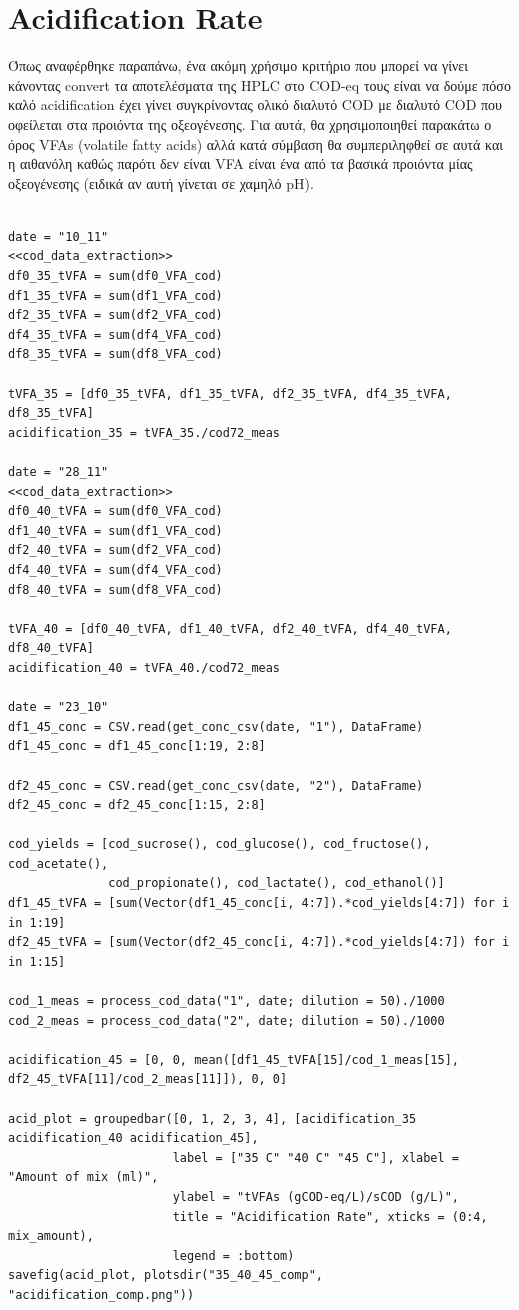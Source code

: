 \documentclass[11pt]{article}
\begin{document}
\section{Acidification Rate}
\label{sec:orgcb787cc}
Όπως αναφέρθηκε παραπάνω, ένα ακόμη χρήσιμο κριτήριο που μπορεί να γίνει κάνοντας convert τα αποτελέσματα της HPLC στο COD-eq τους είναι να δούμε πόσο καλό acidification έχει γίνει συγκρίνοντας ολικό διαλυτό COD με διαλυτό COD που οφείλεται στα προιόντα της οξεογένεσης. Για αυτά, θα χρησιμοποιηθεί παρακάτω ο όρος VFAs (volatile fatty acids) αλλά κατά σύμβαση θα συμπεριληφθεί σε αυτά και η αιθανόλη καθώς παρότι δεν είναι VFA είναι ένα από τα βασικά προιόντα μίας οξεογένεσης (ειδικά αν αυτή γίνεται σε χαμηλό pH).

\begin{verbatim}

date = "10_11"
<<cod_data_extraction>>
df0_35_tVFA = sum(df0_VFA_cod)
df1_35_tVFA = sum(df1_VFA_cod)
df2_35_tVFA = sum(df2_VFA_cod)
df4_35_tVFA = sum(df4_VFA_cod)
df8_35_tVFA = sum(df8_VFA_cod)

tVFA_35 = [df0_35_tVFA, df1_35_tVFA, df2_35_tVFA, df4_35_tVFA, df8_35_tVFA]
acidification_35 = tVFA_35./cod72_meas

date = "28_11"
<<cod_data_extraction>>
df0_40_tVFA = sum(df0_VFA_cod)
df1_40_tVFA = sum(df1_VFA_cod)
df2_40_tVFA = sum(df2_VFA_cod)
df4_40_tVFA = sum(df4_VFA_cod)
df8_40_tVFA = sum(df8_VFA_cod)

tVFA_40 = [df0_40_tVFA, df1_40_tVFA, df2_40_tVFA, df4_40_tVFA, df8_40_tVFA]
acidification_40 = tVFA_40./cod72_meas

date = "23_10"
df1_45_conc = CSV.read(get_conc_csv(date, "1"), DataFrame)
df1_45_conc = df1_45_conc[1:19, 2:8]

df2_45_conc = CSV.read(get_conc_csv(date, "2"), DataFrame)
df2_45_conc = df2_45_conc[1:15, 2:8]

cod_yields = [cod_sucrose(), cod_glucose(), cod_fructose(), cod_acetate(),
              cod_propionate(), cod_lactate(), cod_ethanol()]
df1_45_tVFA = [sum(Vector(df1_45_conc[i, 4:7]).*cod_yields[4:7]) for i in 1:19]
df2_45_tVFA = [sum(Vector(df2_45_conc[i, 4:7]).*cod_yields[4:7]) for i in 1:15]

cod_1_meas = process_cod_data("1", date; dilution = 50)./1000
cod_2_meas = process_cod_data("2", date; dilution = 50)./1000

acidification_45 = [0, 0, mean([df1_45_tVFA[15]/cod_1_meas[15], df2_45_tVFA[11]/cod_2_meas[11]]), 0, 0]

acid_plot = groupedbar([0, 1, 2, 3, 4], [acidification_35 acidification_40 acidification_45],
                       label = ["35 C" "40 C" "45 C"], xlabel = "Amount of mix (ml)",
                       ylabel = "tVFAs (gCOD-eq/L)/sCOD (g/L)",
                       title = "Acidification Rate", xticks = (0:4, mix_amount),
                       legend = :bottom)
savefig(acid_plot, plotsdir("35_40_45_comp", "acidification_comp.png"))

\end{verbatim}
\end{document}
